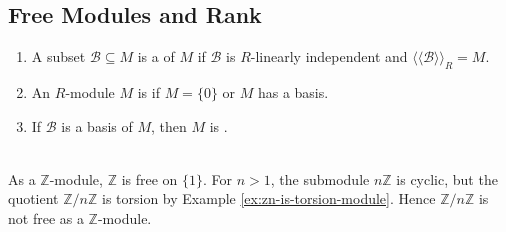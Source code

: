 \subsection{Free Modules and Rank}

\begin{definition} \label{def:free-module-basis} 
\begin{enumerate}[label=(\roman*)]
\setlength{\itemsep}{0pt}
\item A subset $\mathcal{B}\subseteq M$ is a  of $M$ if $\mathcal{B}$ is $R$-linearly independent and $\langle\!\langle\mathcal{B}\rangle\!\rangle_R=M$.
\item An $R$-module $M$ is  if $M=\{0\}$ or $M$ has a basis.
\item If $\mathcal{B}$ is a basis of $M$, then $M$ is .
\end{enumerate}
\end{definition}

\begin{example} \label{ex:quotient-free-module-need-not-free} \\
As a $\mathbb{Z}$-module, $\mathbb{Z}$ is free on $\{1\}$. For $n>1$, the submodule $n\mathbb{Z}$ is cyclic, but the quotient $\mathbb{Z}/n\mathbb{Z}$ is torsion by Example \ref{ex:zn-is-torsion-module}. Hence $\mathbb{Z}/n\mathbb{Z}$ is not free as a $\mathbb{Z}$-module.
\end{example}

